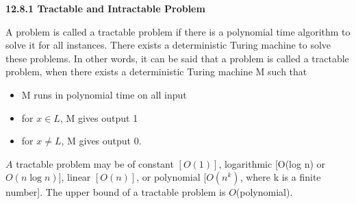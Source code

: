 \documentclass[11pt]{article}
\begin{document}
\vspace*{0.4cm}
\large{
\textbf{12.8.1 Tractable and Intractable Problem}\\
}

\vspace*{0.2cm}

A problem is called a tractable problem if there is a polynomial time algorithm to solve it for all
instances. There exists a deterministic Turing machine to solve these problems. In other words, it can
be said that a problem is called a tractable problem, when there exists a deterministic Turing machine
M such that\\
\vspace*{0.2cm}

\begin{itemize}
  \item M runs in polynomial time on all input\\
  \item for $x \in L$, M gives output 1\\
  \item for $x \neq L$, M gives output 0.\\
\end{itemize}

\vspace*{0.2cm}
\hspace*{0.5cm} $A$ tractable problem may be of constant $[O(1)]$, logarithmic [O(log n) or $O(n \log n)$], linear
$[O(n)]$, or polynomial [$O(n^{k})$, where k is a finite number]. The upper bound of a tractable problem is
$O$(polynomial).\\
\end{document}

